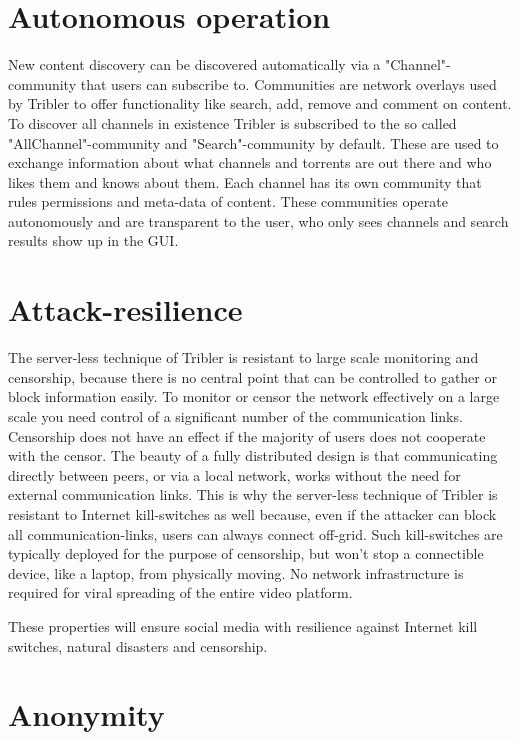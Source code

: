 \section{Autonomous operation}

New content discovery can be discovered automatically via a "Channel"-community that users can subscribe to.
Communities are network overlays used by Tribler to offer functionality like search, add, remove and comment on content.
To discover all channels in existence Tribler is subscribed to the so called "AllChannel"-community and "Search"-community by default.
These are used to exchange information about what channels and torrents are out there and who likes them and knows about them.
Each channel has its own community that rules permissions and meta-data of content.
These communities operate autonomously and are transparent to the user, who only sees channels and search results show up in the GUI.


\section{Attack-resilience}

The server-less technique of Tribler is resistant to large scale monitoring and censorship, because there is no central point that can be controlled to gather or block information easily.
To monitor or censor the network effectively on a large scale you need control of a significant number of the communication links.
Censorship does not have an effect if the majority of users does not cooperate with the censor.
The beauty of a fully distributed design is that communicating directly between peers, or via a local network, works without the need for external communication links.
This is why the server-less technique of Tribler is resistant to Internet kill-switches as well because, even if the attacker can block all communication-links, users can always connect off-grid.
Such kill-switches are typically deployed for the purpose of censorship, but won't stop a connectible device, like a laptop, from physically moving.
No network infrastructure is required for viral spreading of the entire video platform.

These properties will ensure social media with resilience against Internet kill switches, natural disasters and censorship.


\section{Anonymity}

